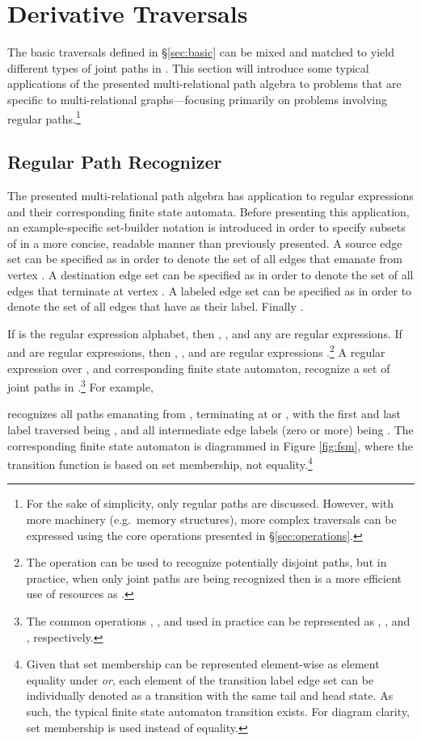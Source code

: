 \documentclass[10pt,conference,letterpaper]{IEEEtran}
\begin{document}
\section{Derivative Traversals\label{sec:derivative}}

The basic traversals defined in \S \ref{sec:basic} can be mixed and matched to yield different types of joint paths in . This section will introduce some typical applications of the presented multi-relational path algebra to problems that are specific to multi-relational graphs---focusing primarily on problems involving regular paths.\footnote{For the sake of simplicity, only regular paths are discussed. However, with more machinery (e.g.~memory structures), more complex traversals can be expressed using the core operations presented in \S \ref{sec:operations}.}

\subsection{Regular Path Recognizer\label{sec:recognizer}}

The presented multi-relational path algebra has application to regular expressions and their corresponding finite state automata. Before presenting this application, an example-specific set-builder notation is introduced in order to specify subsets of  in a more concise, readable manner than previously presented. A source edge set can be specified as  in order to denote the set of all edges that emanate from vertex . A destination edge set can be specified as  in order to denote the set of all edges that terminate at vertex . A labeled edge set can be specified as  in order to denote the set of all edges that have  as their label. Finally .

If  is the regular expression alphabet, then , , and any  are regular expressions. If  and  are regular expressions, then , , and  are regular expressions \cite{comput:moret1997}.\footnote{The  operation can be used to recognize potentially disjoint paths, but in practice, when only joint paths are being recognized then  is a more efficient use of resources as .} A regular expression over , and corresponding finite state automaton, recognize a set of joint paths in .\footnote{The common operations , , and  used in practice can be represented as , , and , respectively.} For example,

recognizes all paths emanating from , terminating at  or , with the first and last label traversed being , and all intermediate edge labels (zero or more) being . The corresponding finite state automaton is diagrammed in Figure \ref{fig:fsm}, where the transition function is based on set membership, not equality.\footnote{Given that set membership can be represented element-wise as element equality under \textit{or}, each element of the transition label edge set can be individually denoted as a transition with the same tail and head state. As such, the typical finite state automaton transition exists. For diagram clarity, set membership is used instead of equality.} 
\end{document}
